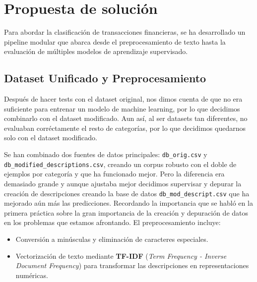 \section{Propuesta de solución}
\label{sec:propuesta}

Para abordar la clasificación de transacciones financieras, se ha desarrollado un pipeline modular que abarca desde el preprocesamiento de texto hasta la evaluación de múltiples modelos de aprendizaje supervisado.

\subsection{Dataset Unificado y Preprocesamiento}
Después de hacer tests con el dataset original, nos dimos cuenta de que no era suficiente para entrenar un modelo de machine learning, por lo que decidimos combinarlo con el dataset modificado. Aun así, al ser datasets tan diferentes, no evaluaban corréctamente el resto de categorías, por lo que decidimos quedarnos solo con el dataset modificado.

Se han combinado dos fuentes de datos principales: \texttt{db\_orig.csv} y \newline \texttt{db\_modified\_descriptions.csv}, creando un corpus robusto con el doble de ejemplos por categoría y que ha funcionado mejor. Pero la diferencia era demasiado grande y aunque ajustaba mejor decidimos supervisar y depurar la creación de descripciones creando la base de datos \texttt{db\_mod\_descript.csv} que ha mejorado aún más las predicciones. Recordando la importancia que se habló en la primera práctica sobre la gran importancia de la creación y depuración de datos en los problemas que estamos afrontando.
\newline El preprocesamiento incluye:
\begin{itemize}
    \item Conversión a minúsculas y eliminación de caracteres especiales.
    \item Vectorización de texto mediante \textbf{TF-IDF} (\textit{Term Frequency - Inverse Document Frequency}) para transformar las descripciones en representaciones numéricas.
\end{itemize}

